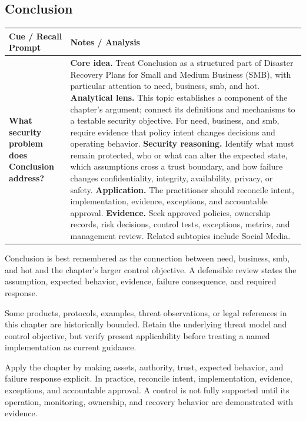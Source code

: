 \documentclass[11pt]{article}
\newcommand{\CornellHeader}{%
\rowcolor{Navy}\color{white}\bfseries Cue / Recall Prompt & \color{white}\bfseries Notes / Analysis\\\hline}
\newcommand{\CornellRow}[2]{%
\cellcolor{CueGray}\RaggedRight\textbf{#1} & \RaggedRight #2\\\hline}
\begin{document}
\subsection*{Conclusion}
\begin{longtable}{>{\RaggedRight\arraybackslash}p{}|>{\RaggedRight\arraybackslash}p{}}
\CornellHeader
\CornellRow{What security problem does Conclusion address?}{\textbf{Core idea.} Treat Conclusion as a structured part of Disaster Recovery Plans for Small and Medium Business (SMB), with particular attention to need, business, smb, and hot. \textbf{Analytical lens.} This topic establishes a component of the chapter's argument; connect its definitions and mechanisms to a testable security objective. For need, business, and smb, require evidence that policy intent changes decisions and operating behavior. \textbf{Security reasoning.} Identify what must remain protected, who or what can alter the expected state, which assumptions cross a trust boundary, and how failure changes confidentiality, integrity, availability, privacy, or safety. \textbf{Application.} The practitioner should reconcile intent, implementation, evidence, exceptions, and accountable approval. \textbf{Evidence.} Seek approved policies, ownership records, risk decisions, control tests, exceptions, metrics, and management review. Related subtopics include Social Media.}
\end{longtable}
\begin{topicsummary}
Conclusion is best remembered as the connection between need, business, smb, and hot and the chapter's larger control objective. A defensible review states the assumption, expected behavior, evidence, failure consequence, and required response.
\end{topicsummary}
\begin{historybox}
Some products, protocols, examples, threat observations, or legal references in this chapter are historically bounded. Retain the underlying threat model and control objective, but verify present applicability before treating a named implementation as current guidance.
\end{historybox}
\begin{defensebox}
Apply the chapter by making assets, authority, trust, expected behavior, and failure response explicit. In practice, reconcile intent, implementation, evidence, exceptions, and accountable approval. A control is not fully supported until its operation, monitoring, ownership, and recovery behavior are demonstrated with evidence.
\end{defensebox}
\end{document}
